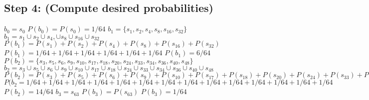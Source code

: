 \documentclass[a4paper,10pt]{article}
\begin{document}
\subsection{Step 4: (Compute desired probabilities)}
$ b_{0} = s_{0} $ \newline
$ P(b_{0}) = P(s_{0}) = 1/64 $ \newline
$ b_{1} = \{s_{1}, s_{2}, s_{4}, s_{8}, s_{16}, s_{32}\} $ \newline
$ b_{1} = s_{1} \cup s_{2} \cup s_{4}, \cup s_{8} \cup s_{16} \cup s_{32} $
$ P(b_{1}) = P(s_{1}) + P(s_{2}) + P(s_{4}) + P(s_{8}) + P(s_{16}) + P(s_{32}) $
$ P(b_{1}) = 1/64 + 1/64 + 1/64 + 1/64 + 1/64 + 1/64 $
$ P(b_{1}) = 6/64 $
$ P(b_{2}) = \{s_{3}, s_{5}, s_{6}, s_{9}, s_{10}, s_{17}, s_{18}, s_{20}, s_{24}, s_{33}, s_{34}, s_{36}, s_{40}, 
s_{48}\} $ \newline
$ b_{2} = s_{3} \cup s_{5} \cup s_{6} \cup s_{9} \cup s_{10} \cup s_{17} \cup s_{18} \cup s_{24} \cup s_{33} \cup 
s_{34} \cup s_{36} \cup s_{40} \cup s_{48} $ \newline
$ P(b_{2}) = P(s_{3}) + P(s_{5}) + P(s_{6}) + P(s_{9}) + P(s_{10}) + P(s_{17}) + P(s_{18}) + P(s_{20}) + P(s_{24}) + 
P(s_{33}) + P(s_{34}) + P(s_{36}) + P(s_{40}) + P(s_{48}) $ \newline
$ P(b_{2} = 1/64 + 1/64 + 1/64 + 1/64 + 1/64 + 1/64 + 1/64 + 1/64 + 1/64 + 1/64 + 1/64 + 1/64 + 1/64 + 1/64 $ 
\newline
$ P(b_{2}) = 14/64 $ \newline
$ b_{3} = s_{63} $ \newline
$ P(b_{3}) = P(s_{63}) $ \newline
$ P(b_{3}) = 1/64 $ \newline
\end{document}
